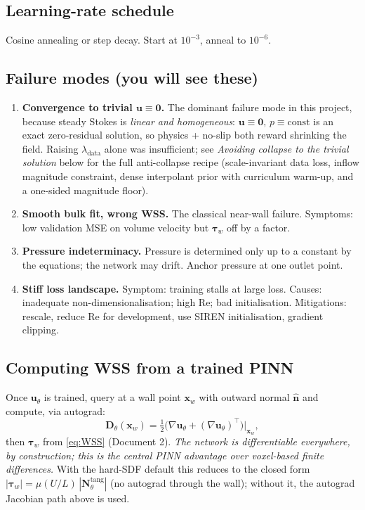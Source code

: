 \documentclass[11pt]{article}
\begin{document}
\subsection*{Learning-rate schedule}
Cosine annealing or step decay. Start at $10^{-3}$, anneal to $10^{-6}$.

\subsection*{Failure modes (you will see these)}
\begin{enumerate}[noitemsep]
\item \textbf{Convergence to trivial $\mathbf{u}\equiv\mathbf{0}$.} The dominant failure mode in this project, because steady Stokes is \emph{linear and homogeneous}: $\mathbf{u}\equiv\mathbf{0},\,p\equiv\text{const}$ is an exact zero-residual solution, so physics + no-slip both reward shrinking the field. Raising $\lambda_{\text{data}}$ alone was insufficient; see \emph{Avoiding collapse to the trivial solution} below for the full anti-collapse recipe (scale-invariant data loss, inflow magnitude constraint, dense interpolant prior with curriculum warm-up, and a one-sided magnitude floor).
\item \textbf{Smooth bulk fit, wrong WSS.} The classical near-wall failure. Symptoms: low validation MSE on volume velocity but $\boldsymbol{\tau}_w$ off by a factor.
\item \textbf{Pressure indeterminacy.} Pressure is determined only up to a constant by the equations; the network may drift. Anchor pressure at one outlet point.
\item \textbf{Stiff loss landscape.} Symptom: training stalls at large loss. Causes: inadequate non-dimensionalisation; high Re; bad initialisation. Mitigations: rescale, reduce Re for development, use SIREN initialisation, gradient clipping.
\end{enumerate}

\subsection*{Computing WSS from a trained PINN}
Once $\mathbf{u}_\theta$ is trained, query at a wall point $\mathbf{x}_w$ with outward normal $\hat{\mathbf{n}}$ and compute, via autograd:
\[
\mathbf{D}_\theta(\mathbf{x}_w) = \tfrac{1}{2}\!\big(\nabla\mathbf{u}_\theta + (\nabla\mathbf{u}_\theta)^\top\big)\Big|_{\mathbf{x}_w},
\]
then $\boldsymbol{\tau}_w$ from \eqref{eq:WSS} (Document 2). \emph{The network is differentiable everywhere, by construction; this is the central PINN advantage over voxel-based finite differences.} With the hard-SDF default this reduces to the closed form $|\boldsymbol\tau_w|=\mu(U/L)\,|\mathbf{N}_\theta^{\text{tang}}|$ (no autograd through the wall); without it, the autograd Jacobian path above is used.
\end{document}

